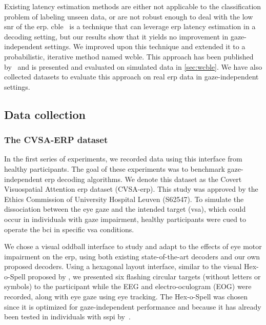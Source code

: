 Existing latency estimation methods are either not applicable to the
classification problem of labeling unseen data, or are not robust enough to
deal with the low \ac{snr} of the \ac{erp}.
\Ac{cble}~\cite{Mowla2017} is a technique that can leverage
\ac{erp} latency estimation in a decoding setting, but our results show that it
yields no improvement in gaze-independent settings.
We improved upon this technique and extended it to a probabilistic, iterative
method named \ac{wcble}.
This approach has been published by~\textcite{VanDenKerchove2024} and is presented
and evaluated on simulated data in \cref{sec:wcble}.
We have also collected datasets to evaluate this approach on real \ac{erp} data
in gaze-independent settings.

\subsection{Data collection}

\subsubsection{The CVSA-ERP dataset}
\label{sec:gaze-independence/approach/cvsa-erp}

In the first series of experiments, we recorded data using this interface from healthy participants.
The goal of these experiments was to benchmark
gaze-independent \ac{erp} decoding algorithms.
We denote this dataset as the Covert Visuospatial Attention \ac{erp} dataset
(CVSA-\ac{erp}).
This study was approved by the Ethics Commission of University Hospital Leuven
(S62547).
To simulate the dissociation between the eye gaze and the
intended target (\ac{vsa}), which could occur in individuals with gaze
impairment, healthy participants were cued to operate the \ac{bci} in specific
\ac{vsa} conditions.

We chose a visual oddball interface to study and adapt
to the effects of eye motor impairment on the \ac{erp}, using both existing state-of-the-art
decoders and our own proposed decoders.
Using a hexagonal layout interface, similar to the visual Hex-o-Spell proposed by
\textcite{Treder2010}, we presented six flashing circular targets
(without letters or symbols) to the participant while the EEG and
electro-oculogram (EOG) were recorded, along with eye gaze using eye tracking.
The Hex-o-Spell was chosen since it is optimized for gaze-independent
performance and because it has already been tested in individuals with
\ac{sspi} by~\textcite{Severens2014}.

